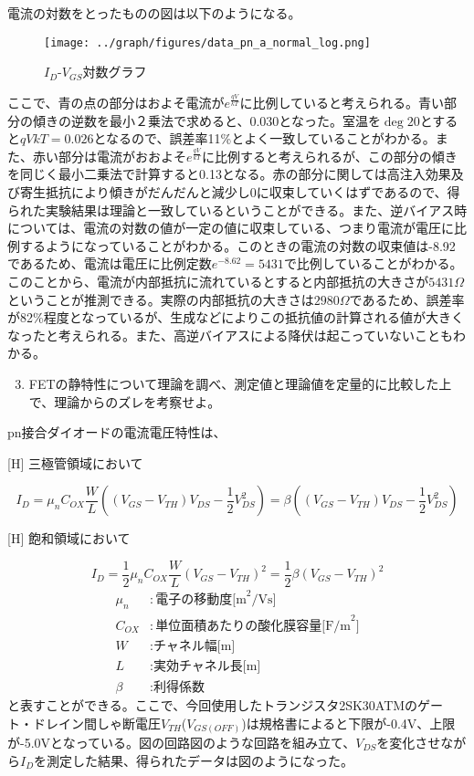 \documentclass[a4j,dvipdfmx,titlepage]{article}
\begin{document}
電流の対数をとったものの図は以下のようになる。
\begin{figure}[H]
  \begin{center}
  \texttt{[image: ../graph/figures/data\_pn\_a\_normal\_log.png]}
  \caption{$I_D$-$V_{GS}$対数グラフ}
  \end{center}
\end{figure}
ここで、青の点の部分はおよそ電流が$e^{\frac{qV}{kT}}$に比例していると考えられる。青い部分の傾きの逆数を最小２乗法で求めると、0.030となった。室温を$\deg{20}$とすると${qV}{kT}=0.026$となるので、誤差率11\%とよく一致していることがわかる。また、赤い部分は電流がおおよそ$e^{\frac{qV}{kT}}$に比例すると考えられるが、この部分の傾きを同じく最小二乗法で計算すると0.13となる。赤の部分に関しては高注入効果及び寄生抵抗により傾きがだんだんと減少し0に収束していくはずであるので、得られた実験結果は理論と一致しているということができる。また、逆バイアス時については、電流の対数の値が一定の値に収束している、つまり電流が電圧に比例するようになっていることがわかる。このときの電流の対数の収束値は-8.92であるため、電流は電圧に比例定数$e^{-8.62}=5431$で比例していることがわかる。このことから、電流が内部抵抗に流れているとすると内部抵抗の大きさが$5431\Omega$ということが推測できる。実際の内部抵抗の大きさは$2980\Omega$であるため、誤差率が82\%程度となっているが、生成などによりこの抵抗値の計算される値が大きくなったと考えられる。また、高逆バイアスによる降伏は起こっていないこともわかる。

\begin{enumerate}[label={(\arabic*)}]
  \setcounter{enumi}{2}
  \item FETの静特性について理論を調べ、測定値と理論値を定量的に比較した上で、理論からのズレを考察せよ。
\end{enumerate}

pn接合ダイオードの電流電圧特性は、\\
\begin{center}[H]
  三極管領域において
\end{center}
$$
I_D = \mu_nC_{OX}\frac{W}{L}\left((V_{GS}-V_{TH})V_{DS} - \frac{1}{2}V_{DS}^2\right) = \beta\left((V_{GS}-V_{TH})V_{DS} - \frac{1}{2}V_{DS}^2\right)
$$
\begin{center}[H]
    飽和領域において
\end{center}
$$
I_D = \frac{1}{2}\mu_nC_{OX}\frac{W}{L}\left(V_{GS}-V_{TH}\right)^2 = \frac{1}{2}\beta(V_{GS}-V_{TH})^2
$$
\begin{align}[H]
  \mu_n &: \mbox{電子の移動度[m}^2\mbox{/Vs]}\nonumber \\
  C_{OX} &: \mbox{単位面積あたりの酸化膜容量[F/m}^2\mbox{]} \nonumber \\
  W &: \mbox{チャネル幅[m]} \nonumber \\
  L &: \mbox{実効チャネル長[m]} \nonumber \\
  \beta &: \mbox{利得係数} \nonumber
\end{align}
と表すことができる。ここで、今回使用したトランジスタ2SK30ATMのゲート・ドレイン間しゃ断電圧$V_{TH}$($V_{GS(OFF)}$)は規格書によると下限が-0.4V、上限が-5.0Vとなっている。図の回路図のような回路を組み立て、$V_{DS}$を変化させながら$I_D$を測定した結果、得られたデータは図のようになった。
\end{document}
